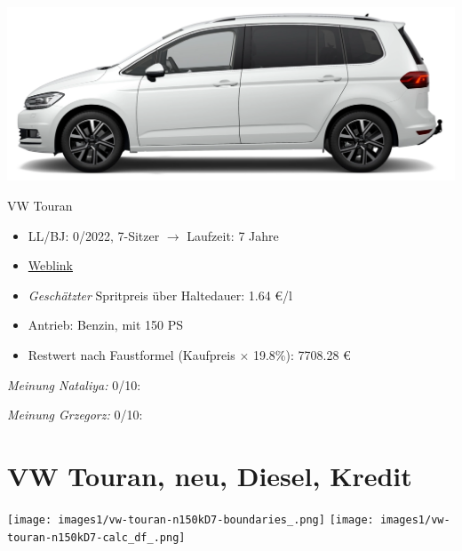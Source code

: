 \documentclass[landscape, DIV=99, 14pt]{scrartcl}
\begin{document}
\pagebreak
\begin{center}
\includegraphics[width=0.9\columnwidth]{cars/vw-touran-neu-benzin.png}

VW Touran
\end{center}

\begin{itemize}
    \item LL/BJ: 0/2022, 7-Sitzer $\rightarrow$ Laufzeit: 7 Jahre
    \item \href{https://www.volkswagen.de/de/konfigurator.html/__app/touran/touran/highline.app?buildabilityStatus-app=buildable&category-app=private&carlineId-app=31000&salesGroupId-app=32600&trimName-app=Highline&modelId-app=5T14PZ%24GYORYOR&modelVersion-app=2&modelYear-app=2022&exteriorId-app=F14+0Q0Q&interiorId-app=F56+++++BG&options-app=GWBGWBG-GPG3PG3-MAHV1M6-GPF9PF9-GRBDRBD-MKSUKA1-MSSH4KF-GP19P19-MVTV9IJ-GWQ1WQ1}{Weblink}
    \item \emph{Gesch\"atzter} Spritpreis \"uber Haltedauer: 1.64 \euro{}/l
    \item Antrieb: Benzin, mit 150 PS
    \item Restwert nach Faustformel (Kaufpreis $\times$ 19.8\%): 7708.28 \euro{}
\end{itemize}

\begin{small}
\emph{Meinung Nataliya:} 0/10: 
        
\emph{Meinung Grzegorz:} 0/10: 
\end{small}

\pagebreak


\twocolumn

\section*{VW Touran, neu, Diesel, Kredit}
\begin{center}
\texttt{[image: images1/vw-touran-n150kD7-boundaries\_.png]}
\null
\vspace{0.5cm}
\texttt{[image: images1/vw-touran-n150kD7-calc\_df\_.png]}
\end{center}
\end{document}

